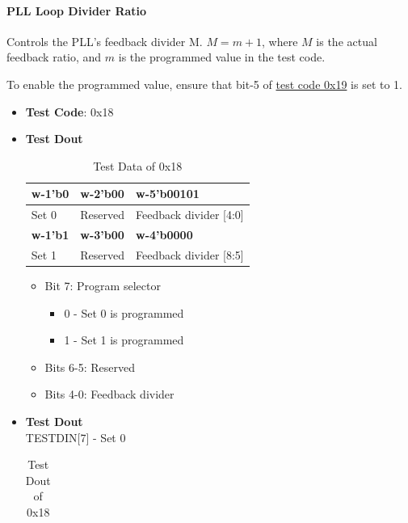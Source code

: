 \documentclass[main\_\_EN.tex]{subfiles}
\begin{document}
\paragraph{PLL Loop Divider Ratio}
\label{sec:test-code-0x18}
Controls the PLL's feedback divider M. $M = m+1$, where $M$ is the actual feedback ratio, and $m$ is the programmed value in the test code.

To enable the programmed value, ensure that bit-5 of \hyperref[sec:test-code-0x19]{test code 0x19} is set to 1.

\begin{itemize}
    \item \textbf{Test Code}: 0x18
    \item \textbf{Test Dout} 
        \begin{longtable}{ |p{4cm}|p{4cm}|p{4cm}|}
            \caption{Test Data of 0x18}
            \label{tab:test-data-0x18} \\
            \hline
            \rowcolor{lightgray}
            \textbf{w-1'b0} & \textbf{w-2'b00} & \textbf{w-5'b00101} \\ \hline
            Set 0 & Reserved & Feedback divider [4:0]  \\ \hline
            \rowcolor{lightgray}
            \textbf{w-1'b1} & \textbf{w-3'b00} & \textbf{w-4'b0000} \\ \hline
            Set 1 & Reserved & Feedback divider [8:5]  \\ \hline
        \end{longtable}
        \begin{itemize}
            \item Bit 7: Program selector
                \begin{itemize}
                    \item 0 - Set 0 is programmed
                    \item 1 - Set 1 is programmed
                \end{itemize}
            \item Bits 6-5: Reserved
            \item Bits 4-0: Feedback divider
        \end{itemize}
    \item \textbf{Test Dout}\\
        TESTDIN[7] - Set 0
        \begin{longtable}{ |p{4cm}|p{8cm}|}
            \caption{Test Dout of 0x18}
            \label{tab:test-dout-0x18-set0} \\

\end{longtable}
\end{itemize}
\end{document}
